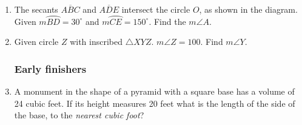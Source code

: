 \documentclass[12pt, twoside]{article}
\begin{document}
\begin{enumerate}
\newpage
  \item The secants $\overline{ABC}$ and $\overline{ADE}$ intersect the circle $O$, as shown in the diagram. \\Given $m \wideparen{BD}=30^\circ$ and $m \wideparen{CE}=150^\circ$. Find the $m\angle A$.
       \begin{center}
     \end{center} \vspace{2cm}

   \item Given circle $Z$ with inscribed $\triangle XYZ$. $m\angle Z=100$. Find $m\angle Y$.\\[1cm]
        \vspace{3cm}

\newpage
\subsubsection*{Early finishers}

  \item A monument in the shape of a pyramid with a square base has a volume of 24 cubic feet. If its height measures 20 feet what is the length of the side of the base, to the \emph{nearest cubic foot}? \vspace{3.5cm}



\end{enumerate}
\end{document}
